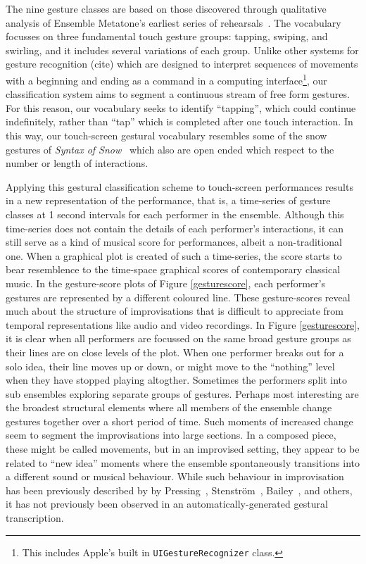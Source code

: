 \documentclass[graybox]{svmult}
\begin{document}
The nine gesture classes are based on those discovered through
qualitative analysis of Ensemble Metatone's earliest series of
rehearsals~\cite{Martin:2014jk}. The vocabulary focusses on three
fundamental touch gesture groups: tapping, swiping, and swirling, and
it includes several variations of each group. Unlike other systems for
gesture recognition (cite) which are designed to interpret sequences
of movements with a beginning and ending as a command in a computing
interface\footnote{This includes Apple's built in
  \texttt{UIGestureRecognizer} class.}, our classification system aims
to segment a continuous stream of free form gestures. For this reason,
our vocabulary seeks to identify ``tapping'', which could continue
indefinitely, rather than ``tap'' which is completed after one touch
interaction. In this way, our touch-screen gestural vocabulary
resembles some of the snow gestures of \emph{Syntax of
  Snow}~\cite{Burtner:2011fk} which also are open ended which respect
to the number or length of interactions. 

Applying this gestural classification scheme to touch-screen
performances results in a new representation of the performance, that
is, a time-series of gesture classes at 1 second intervals for each
performer in the ensemble. Although this time-series does not contain
the details of each performer's interactions, it can still serve as a
kind of musical score for performances, albeit a non-traditional one.
When a graphical plot is created of such a time-series, the score
starts to bear resemblence to the time-space graphical scores of
contemporary classical music. In the gesture-score plots of Figure
\ref{gesturescore}, each performer's gestures are represented by a
different coloured line. These gesture-scores reveal much about the
structure of improvisations that is difficult to appreciate from
temporal representations like audio and video recordings. In Figure
\ref{gesturescore}, it is clear when all performers are focussed on
the same broad gesture groups as their lines are on close levels of
the plot. When one performer breaks out for a solo idea, their line
moves up or down, or might move to the ``nothing'' level when they
have stopped playing altogther. Sometimes the performers split into
sub ensembles exploring separate groups of gestures. Perhaps most
interesting are the broadest structural elements where all members of
the ensemble change gestures together over a short period of time.
Such moments of increased change seem to segment the improvisations
into large sections. In a composed piece, these might be called
movements, but in an improvised setting, they appear to be related to
``new idea'' moments where the ensemble spontaneously transitions into
a different sound or musical behaviour. While such behaviour in
improvisation has been previously described by by
Pressing~\cite{Pressing:1988uo}, Stenstr\"om~\cite{Stenstrom:2009xy},
Bailey~\cite{Bailey:1993zl}, and others, it has not previously been
observed in an automatically-generated gestural transcription.
\end{document}
